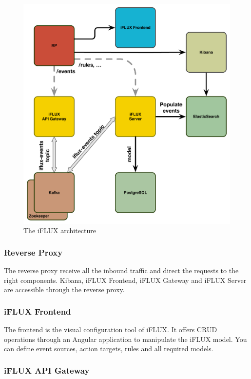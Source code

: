 \begin{figure}
\centering
\includegraphics[width=1\columnwidth]{figures/iflux-archi.pdf}
\caption{The iFLUX architecture}
\label{fig:iflux-archi}
\end{figure}

\subsubsection{Reverse Proxy}

The reverse proxy receive all the inbound traffic and direct the requests to the right components. Kibana, iFLUX Frontend, iFLUX Gateway and iFLUX Server are accessible through the reverse proxy.

\subsubsection{iFLUX Frontend}

The frontend is the visual configuration tool of iFLUX. It offers CRUD operations through an Angular application to manipulate the iFLUX model. You can define event sources, action targets, rules and all required models.

\subsubsection{iFLUX API Gateway}

